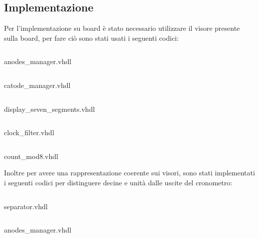  \subsection{Implementazione}
 Per l'implementazione su board è stato necessario utilizzare il visore presente sulla board, per fare ciò sono stati usati i seguenti codici:
 \begin{code}
    \inputminted[frame=lines, framesep=2mm, baselinestretch=1.2, bgcolor=LightGray, fontsize=\footnotesize, linenos]{vhdl}{vhdl_files/cron_board/anodes_manager.vhd}
    \caption{anodes\_manager.vhdl}
    \label{lbl:ROMC}
\end{code}
 \begin{code}
    \inputminted[frame=lines, framesep=2mm, baselinestretch=1.2, bgcolor=LightGray, fontsize=\footnotesize, linenos]{vhdl}{vhdl_files/cron_board/anodes_manager.vhd}
    \caption{catode\_manager.vhdl}
    \label{lbl:ROMC}
\end{code}
 \begin{code}
    \inputminted[frame=lines, framesep=2mm, baselinestretch=1.2, bgcolor=LightGray, fontsize=\footnotesize, linenos]{vhdl}{vhdl_files/cron_board/display_seven_segments.vhd}
    \caption{display\_seven\_segments.vhdl}
    \label{lbl:ROMC}
\end{code}
\begin{code}
    \inputminted[frame=lines, framesep=2mm, baselinestretch=1.2, bgcolor=LightGray, fontsize=\footnotesize, linenos]{vhdl}{vhdl_files/cron_board/clock_filter.vhd}
    \caption{clock\_filter.vhdl}
    \label{lbl:ROMC}
\end{code}
\begin{code}
    \inputminted[frame=lines, framesep=2mm, baselinestretch=1.2, bgcolor=LightGray, fontsize=\footnotesize, linenos]{vhdl}{vhdl_files/cron_board/count_mod8.vhd}
    \caption{count\_mod8.vhdl}
    \label{lbl:ROMC}
\end{code}
Inoltre per avere una rappresentazione coerente sui visori, sono stati implementati i seguenti codici per distinguere decine e unità dalle uscite del cronometro:
 \begin{code}
    \inputminted[frame=lines, framesep=2mm, baselinestretch=1.2, bgcolor=LightGray, fontsize=\footnotesize, linenos]{vhdl}{vhdl_files/cron_board/separator.vhd}
    \caption{separator.vhdl}
    \label{lbl:ROMC}
\end{code}
 \begin{code}
    \inputminted[frame=lines, framesep=2mm, baselinestretch=1.2, bgcolor=LightGray, fontsize=\footnotesize, linenos]{vhdl}{vhdl_files/cron_board/sep_h_m_s.vhd}
    \caption{anodes\_manager.vhdl}
    \label{lbl:ROMC}
\end{code}
